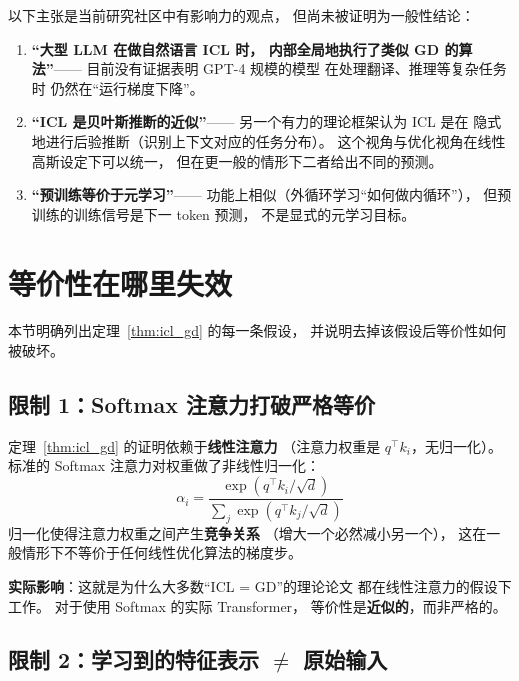 \begin{viewpointbox}
以下主张是当前研究社区中有影响力的观点，
但尚未被证明为一般性结论：

\begin{enumerate}
  \item \textbf{``大型 LLM 在做自然语言 ICL 时，
    内部全局地执行了类似 GD 的算法''}——
    目前没有证据表明 GPT-4 规模的模型
    在处理翻译、推理等复杂任务时
    仍然在``运行梯度下降''。

  \item \textbf{``ICL 是贝叶斯推断的近似''}——
    另一个有力的理论框架认为 ICL 是在
    隐式地进行后验推断（识别上下文对应的任务分布）。
    这个视角与优化视角在线性高斯设定下可以统一，
    但在更一般的情形下二者给出不同的预测。

  \item \textbf{``预训练等价于元学习''}——
    功能上相似（外循环学习``如何做内循环''），
    但预训练的训练信号是下一 token 预测，
    不是显式的元学习目标。
\end{enumerate}
\end{viewpointbox}

\section{等价性在哪里失效}
\label{sec:icl_breaks}

本节明确列出定理~\ref{thm:icl_gd} 的每一条假设，
并说明去掉该假设后等价性如何被破坏。

\subsection*{限制 1：Softmax 注意力打破严格等价}

定理~\ref{thm:icl_gd} 的证明依赖于\textbf{线性注意力}
（注意力权重是 $q^\top k_i$，无归一化）。
标准的 Softmax 注意力对权重做了非线性归一化：
\[
  \alpha_i = \frac{\exp(q^\top k_i / \sqrt{d})}{\sum_j \exp(q^\top k_j / \sqrt{d})}
\]
归一化使得注意力权重之间产生\textbf{竞争关系}
（增大一个必然减小另一个），
这在一般情形下不等价于任何线性优化算法的梯度步。

\textbf{实际影响}：这就是为什么大多数``ICL = GD''的理论论文
都在线性注意力的假设下工作。
对于使用 Softmax 的实际 Transformer，
等价性是\textbf{近似的}，而非严格的。

\subsection*{限制 2：学习到的特征表示 $\neq$ 原始输入}

